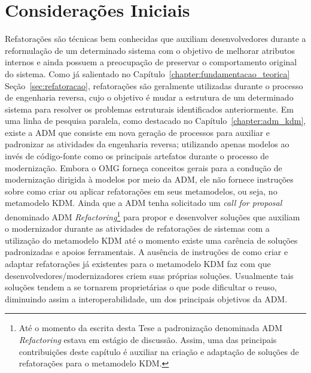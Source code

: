 \section{Considerações Iniciais}

Refatorações são técnicas bem conhecidas que auxiliam desenvolvedores durante a reformulação de um determinado sistema com o objetivo de melhorar atributos internos e ainda possuem a preocupação de preservar o comportamento original do sistema. Como já salientado no Capítulo~\ref{chapter:fundamentacao_teorica} Seção~\ref{sec:refatoracao}, refatorações são geralmente utilizadas durante o processo de engenharia reversa, cujo o objetivo é mudar a estrutura de um determinado sistema para resolver os problemas estruturais identificados anteriormente. Em uma linha de pesquisa paralela, como destacado no Capítulo~\ref{chapter:adm_kdm}, existe a ADM que consiste em nova geração de processos para auxiliar e padronizar as atividades da engenharia reversa; utilizando apenas modelos ao invés de código-fonte como os principais artefatos durante o processo de modernização. Embora o OMG forneça conceitos gerais para a condução de modernização dirigida à modelos por meio da ADM, ele não fornece instruções sobre como criar ou aplicar refatorações em seus metamodelos, ou seja, no metamodelo KDM. Ainda que a ADM tenha solicitado um \textit{call for proposal} denominado ADM \textit{Refactoring}\footnote{Até o momento da escrita desta Tese a padronização denominada ADM \textit{Refactoring} estava em estágio de discussão. Assim, uma das principais contribuições deste capítulo é auxiliar na criação e adaptação de soluções de refatorações para o metamodelo KDM.} para propor e desenvolver soluções que auxiliam o modernizador durante as atividades de refatorações de sistemas com a utilização do metamodelo KDM até o momento existe uma carência de soluções padronizadas e apoios ferramentais. A ausência de instruções de como criar e adaptar refatorações já existentes para o metamodelo KDM faz com que desenvolvedores/modernizadores criem suas próprias soluções. Usualmente tais soluções tendem a se tornarem proprietárias o que pode dificultar o reuso, diminuindo assim a interoperabilidade, um dos principais objetivos da ADM.

